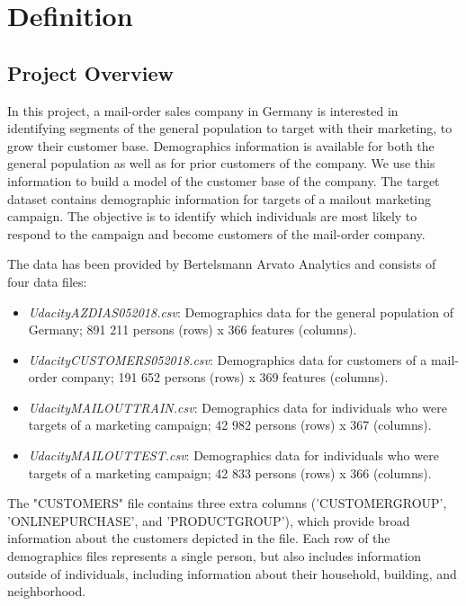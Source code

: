 \section{Definition}

\subsection{Project Overview}

In this project, a mail-order sales company in Germany is interested in identifying segments of the general population to target with their marketing, to grow their customer base. Demographics information is available for both the general population as well as for prior customers of the company. We use this information to build a model of the customer base of the company. The target dataset contains demographic information for targets of a mailout marketing campaign. The objective is to identify which individuals are most likely to respond to the campaign and become customers of the mail-order company.

The data has been provided by Bertelsmann Arvato Analytics and consists of four data files: 

\begin{itemize}
\item \emph{Udacity\textunderscore AZDIAS\textunderscore 052018.csv}: Demographics data for the general population of Germany; 891 211 persons (rows) x 366 features (columns).
\item \emph{Udacity\textunderscore CUSTOMERS\textunderscore 052018.csv}: Demographics data for customers of a mail-order company; 191 652 persons (rows) x 369 features (columns).
\item \emph{Udacity\textunderscore MAILOUT\textunderscore TRAIN.csv}: Demographics data for individuals who were targets of a marketing campaign; 42 982 persons (rows) x 367 (columns).
\item \emph{Udacity\textunderscore MAILOUT\textunderscore TEST.csv}: Demographics data for individuals who were targets of a marketing campaign; 42 833 persons (rows) x 366 (columns).
\end{itemize}
The "CUSTOMERS" file contains three extra columns ('CUSTOMER\textunderscore GROUP', 'ONLINE\textunderscore PURCHASE', and 'PRODUCT\textunderscore GROUP'), which provide broad information about the customers depicted in the file. Each row of the demographics files represents a single person, but also includes information outside of individuals, including information about their household, building, and neighborhood.

